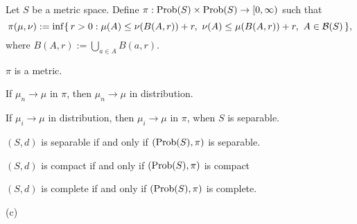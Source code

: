 \documentclass{../../large}
\begin{document}
\begin{prb}
Let $S$ be a metric space.
Define $\pi:\operatorname{Prob}(S)\times\operatorname{Prob}(S)\to[0,\infty)$ such that
\[\pi(\mu,\nu):=\inf\{\,r>0:\mu(A)\le\nu(B(A,r))+r,\ \nu(A)\le\mu(B(A,r))+r,\ A\in\cB(S)\,\},\]
where $B(A,r):=\bigcup_{a\in A}B(a,r)$.
\begin{parts}
\item $\pi$ is a metric.
\item If $\mu_n\to\mu$ in $\pi$, then $\mu_n\to\mu$ in distribution.
\item If $\mu_i\to\mu$ in distribution, then $\mu_i\to\mu$ in $\pi$, when $S$ is separable.
\item $(S,d)$ is separable if and only if $(\operatorname{Prob}(S),\pi)$ is separable.
\item $(S,d)$ is compact if and only if $(\operatorname{Prob}(S),\pi)$ is compact
\item $(S,d)$ is complete if and only if $(\operatorname{Prob}(S),\pi)$ is complete.
\end{parts}
\end{prb}
\begin{pf}
(c)
\end{pf}
\end{document}
